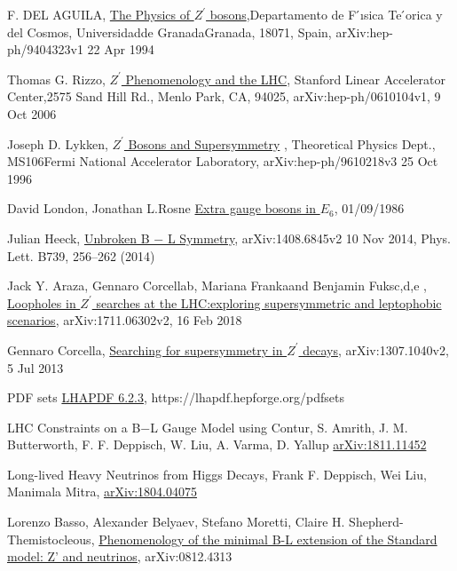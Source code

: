 \documentclass[12pt,a4paper]{article}		%
\begin{document}
\begin{thebibliography}{}
	 F. DEL AGUILA,  \href{https://arxiv.org/pdf/hep-ph/9404323.pdf}{The Physics of $Z^\prime$ bosons},Departamento de F ́ısica Te ́orica y del Cosmos, Universidadde GranadaGranada, 18071, Spain, arXiv:hep-ph/9404323v1  22 Apr 1994
	
	 Thomas G. Rizzo, \href{https://arxiv.org/pdf/hep-ph/0610104.pdf}{$Z^\prime$ Phenomenology and the LHC},  Stanford Linear Accelerator Center,2575 Sand Hill Rd., Menlo Park, CA, 94025, arXiv:hep-ph/0610104v1,  9 Oct 2006
	
	 Joseph D. Lykken, \href{https://arxiv.org/pdf/hep-ph/9610218.pdf}{$Z^\prime$ Bosons and Supersymmetry} , Theoretical Physics Dept., MS106Fermi National Accelerator Laboratory, arXiv:hep-ph/9610218v3  25 Oct 1996
	
	 David London, Jonathan L.Rosne \href{https://journals.aps.org/prd/pdf/10.1103/PhysRevD.34.1530}{Extra gauge bosons in $E_6$}, 01/09/1986
	
	 Julian Heeck, \href{https://arxiv.org/pdf/1408.6845.pdf}{Unbroken B − L Symmetry}, arXiv:1408.6845v2 10 Nov 2014, Phys. Lett. B739, 256–262 (2014) 
	
	 Jack Y. Araza, Gennaro Corcellab, Mariana Frankaand Benjamin Fuksc,d,e , \href{https://arxiv.org/pdf/1711.06302.pdf}{Loopholes in $Z^\prime$ searches at the LHC:exploring supersymmetric and leptophobic scenarios}, arXiv:1711.06302v2, 16 Feb 2018 
	
	 Gennaro Corcella, \href{https://arxiv.org/pdf/1307.1040.pdf}{Searching for supersymmetry in $Z^\prime$ decays}, arXiv:1307.1040v2, 5 Jul 2013
	
	 PDF sets \href{https://lhapdf.hepforge.org/pdfsets}{LHAPDF 6.2.3}, https://lhapdf.hepforge.org/pdfsets
	
	 LHC Constraints on a B−L Gauge Model using Contur, S. Amrith, J. M. Butterworth, F. F. Deppisch, W. Liu, A. Varma, D. Yallup \href{https://arxiv.org/abs/1811.11452}{arXiv:1811.11452}
	
	 Long-lived Heavy Neutrinos from Higgs Decays, Frank F. Deppisch, Wei Liu, Manimala Mitra, \href{https://arxiv.org/abs/1804.04075}{arXiv:1804.04075}
	
	 Lorenzo Basso, Alexander Belyaev, Stefano Moretti, Claire H. Shepherd-Themistocleous, \href{https://arxiv.org/abs/0812.4313}{Phenomenology of the minimal B-L extension of the Standard model: Z' and neutrinos}, arXiv:0812.4313
	

\end{thebibliography}
\end{document}
